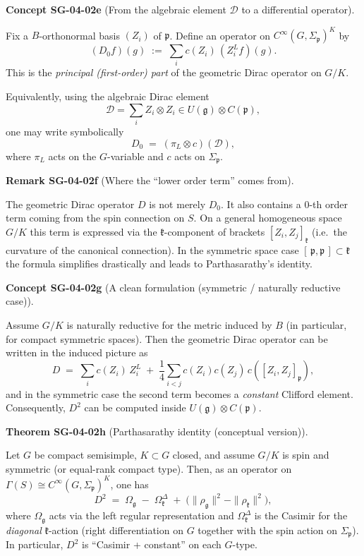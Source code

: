 \documentclass[10pt, letterpaper]{article}
\newcommand{\Cinf}{C^{\infty}}
\newcommand{\CustomHeading}[3]{%
  \par\medskip\noindent%
  \textbf{#1 #2} \textnormal{(#3)}.\enskip%
}
\newenvironment{THEO}[2]{\begin{unitbox}\CustomHeading{Theorem}{#1}{#2}}{\end{unitbox}}
\newenvironment{REM}[2]{\begin{unitbox}\CustomHeading{Remark}{#1}{#2}}{\end{unitbox}}
\newenvironment{CONC}[2]{\begin{unitbox}\CustomHeading{Concept}{#1}{#2}}{\end{unitbox}}
\begin{document}
\begin{CONC}{SG-04-02e}{From the algebraic element $\mathcal D$ to a differential operator}
Fix a $B$-orthonormal basis $(Z_i)$ of $\mathfrak p$.
Define an operator on $\Cinf(G,\Sigma_{\mathfrak p})^K$ by
\[
(D_0 f)(g) \;:=\; \sum_i c(Z_i)\, (Z_i^L f)(g).
\]
This is the \emph{principal (first-order) part} of the geometric Dirac operator on $G/K$.

Equivalently, using the algebraic Dirac element
\[
\mathcal D=\sum_i Z_i\otimes Z_i\in U(\mathfrak g)\otimes C(\mathfrak p),
\]
one may write symbolically
\[
D_0 \;=\; (\pi_L\otimes c)(\mathcal D),
\]
where $\pi_L$ acts on the $G$-variable and $c$ acts on $\Sigma_{\mathfrak p}$.
\end{CONC}

\begin{REM}{SG-04-02f}{Where the ``lower order term'' comes from}
The geometric Dirac operator $D$ is not merely $D_0$.
It also contains a $0$-th order term coming from the spin connection on $S$.
On a general homogeneous space $G/K$ this term is expressed via the $\mathfrak k$-component of brackets
$[Z_i,Z_j]_{\mathfrak k}$ (i.e.\ the curvature of the canonical connection).
In the symmetric space case $[\,\mathfrak p,\mathfrak p\,]\subset\mathfrak k$ the formula simplifies drastically
and leads to Parthasarathy's identity.
\end{REM}

\begin{CONC}{SG-04-02g}{A clean formulation (symmetric / naturally reductive case)}
Assume $G/K$ is naturally reductive for the metric induced by $B$ (in particular, for compact symmetric spaces).
Then the geometric Dirac operator can be written in the induced picture as
\[
D \;=\; \sum_i c(Z_i)\,Z_i^L \;+\; \frac{1}{4}\sum_{i<j} c(Z_i)c(Z_j)\,c([Z_i,Z_j]_{\mathfrak p}),
\]
and in the symmetric case the second term becomes a \emph{constant} Clifford element.
Consequently, $D^2$ can be computed inside $U(\mathfrak g)\otimes C(\mathfrak p)$.
\end{CONC}

\begin{THEO}{SG-04-02h}{Parthasarathy identity (conceptual version)}
Let $G$ be compact semisimple, $K\subset G$ closed, and assume $G/K$ is spin and symmetric (or equal-rank compact type).
Then, as an operator on $\Gamma(S)\cong \Cinf(G,\Sigma_{\mathfrak p})^K$, one has
\[
D^2 \;=\; \Omega_{\mathfrak g} \;-\; \Omega_{\mathfrak k}^{\Delta} \;+\; \big(\|\rho_{\mathfrak g}\|^2-\|\rho_{\mathfrak k}\|^2\big),
\]
where $\Omega_{\mathfrak g}$ acts via the left regular representation and
$\Omega_{\mathfrak k}^{\Delta}$ is the Casimir for the \emph{diagonal} $\mathfrak k$-action
(right differentiation on $G$ together with the spin action on $\Sigma_{\mathfrak p}$).
In particular, $D^2$ is ``Casimir + constant'' on each $G$-type.
\end{THEO}
\end{document}

